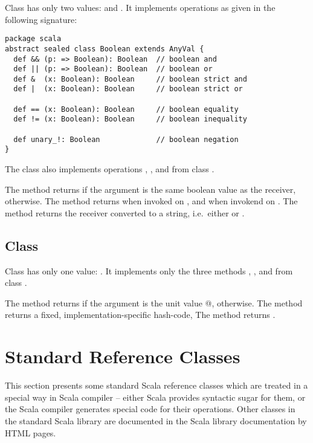 {Class  has only two values:  and
. It implements operations as given in the following
signature:

\begin{lstlisting}
package scala 
abstract sealed class Boolean extends AnyVal {
  def && (p: => Boolean): Boolean  // boolean and
  def || (p: => Boolean): Boolean  // boolean or
  def &  (x: Boolean): Boolean     // boolean strict and
  def |  (x: Boolean): Boolean     // boolean strict or

  def == (x: Boolean): Boolean     // boolean equality
  def != (x: Boolean): Boolean     // boolean inequality

  def unary_!: Boolean             // boolean negation
}
\end{lstlisting}
The class also implements operations , ,
and  from class .

The  method returns  if the argument is the
same boolean value as the receiver,  otherwise.  The
 method returns  when invoked on , 
and  when invokend on . The  method
returns the receiver converted to a string, i.e.\ either 
or .

\subsection{Class \large{}}

Class  has only one value: \code{()}. It implements only
the three methods , , and 
from class .

The  method returns  if the argument is the
unit value \lstinline@{}@,  otherwise.  The
 method returns a fixed, implementation-specific hash-code, 
The  method returns .

\section{Standard Reference Classes}
\label{cls:reference}

This section presents some standard Scala reference classes which are
treated in a special way in Scala compiler -- either Scala provides
syntactic sugar for them, or the Scala compiler generates special code
for their operations. Other classes in the standard Scala library are
documented in the Scala library documentation by HTML pages.

}
